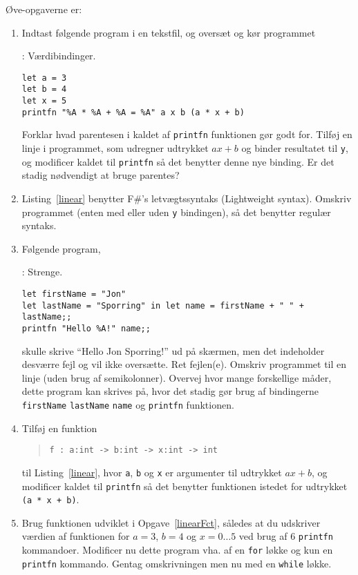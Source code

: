 \documentclass[a4paper,12pt]{article}
\begin{document}
Øve-opgaverne er:
\begin{enumerate}[label=3ø.\arabic*,start=0]
\item Indtast følgende program i en tekstfil, og oversæt og kør programmet 
  \begin{codeNOutput}[label=linear]{: Værdibindinger.}
\begin{lstlisting}
let a = 3
let b = 4
let x = 5
printfn "%A * %A + %A = %A" a x b (a * x + b)
\end{lstlisting}
\end{codeNOutput}
Forklar hvad parentesen i kaldet af \lstinline!printfn! funktionen gør godt for. Tilføj en linje i programmet, som udregner udtrykket $ax+b$ og binder resultatet til \lstinline!y!, og modificer kaldet til \lstinline!printfn! så det benytter denne nye binding. Er det stadig nødvendigt at bruge parentes?
\item Listing~\ref{linear} benytter F\#'s letvægtssyntaks (Lightweight syntax). Omskriv programmet (enten med eller uden \lstinline!y! bindingen), så det benytter regulær syntaks.
\item Følgende program,
  \begin{codeNOutput}{: Strenge.}
\begin{lstlisting}
let firstName = "Jon"
let lastName = "Sporring" in let name = firstName + " " + lastName;;
printfn "Hello %A!" name;;
\end{lstlisting}
\end{codeNOutput}
skulle skrive "`Hello Jon Sporring!"' ud på skærmen, men det indeholder desværre fejl og vil ikke oversætte. Ret fejlen(e). Omskriv programmet til en linje (uden brug af semikolonner). Overvej hvor mange forskellige måder, dette program kan skrives på, hvor det stadig gør brug af bindingerne \lstinline!firstName! \lstinline!lastName! \lstinline!name! og \lstinline!printfn! funktionen. 
\item \label{linearFct} Tilføj en funktion
  \begin{quote}
    \mbox{\lstinline!f : a:int -> b:int -> x:int -> int!}
  \end{quote}
til Listing~\ref{linear}, hvor \lstinline!a!, \lstinline!b! og \lstinline!x! er argumenter til udtrykket $ax+b$, og modificer kaldet til \lstinline!printfn! så det benytter funktionen istedet for udtrykket \lstinline!(a * x + b)!.
\item \label{table} Brug funktionen udviklet i Opgave~\ref{linearFct}, således at du udskriver værdien af funktionen for $a=3$, $b=4$ og $x=0\ldots5$ ved brug af 6 \lstinline!printfn! kommandoer. Modificer nu dette program vha. af en \lstinline!for! løkke og kun en \lstinline!printfn! kommando. Gentag omskrivningen men nu med en \lstinline!while! løkke.

\end{enumerate}
\end{document}
